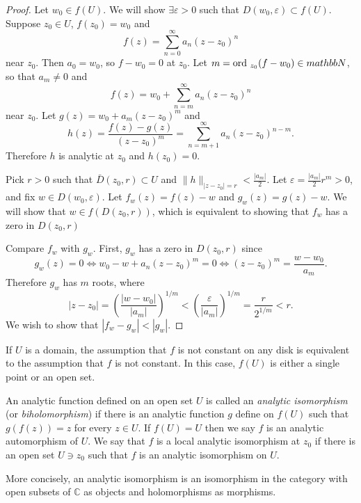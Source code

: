 \begin{proof}
Let $w_0 \in f(U)$. We will show $\exists \varepsilon > 0$
such that $D(w_0, \varepsilon) \subset f(U)$. Suppose
$z_0 \in U$, $f(z_0) = w_0$ and
$$
  f(z)
= \sum_{n=0}^\infty a_n (z - z_0)^n
$$ near $z_0$.
Then $a_0 = w_0$, so $f - w_0 = 0$ at $z_0$.
Let $m = \mathrm{ord}~_{z_0} (f - w_0) \in mathbb{N}$, so that
$a_m \neq 0$ and
$$
f(z) = w_0 + \sum_{n=m}^\infty a_n (z - z_0)^n
$$
near $z_0$. Let $g(z) = w_0 + a_m (z - z_0)^m$ and
$$
  h(z)
= \frac{f(z) - g(z)}{(z - z_0)^m}
= \sum_{n=m+1}^\infty a_n (z - z_0)^{n-m}.
$$
Therefore $h$ is analytic at $z_0$ and $h(z_0) = 0$.

Pick $r > 0$ such that
$\bar{D}(z_0, r) \subset U$ and
$\| h \|_{|z - z_0| = r} < \frac{|a_m|}{2}$. Let
$\varepsilon = \frac{|a_m|}{2} r^m > 0$, and fix
$w \in D(w_0, \varepsilon)$. Let $f_w(z) = f(z) - w$
and $g_w(z) = g(z) - w$. We will show that
$w \in f(D(z_0, r))$, which is equivalent to showing
that $f_w$ has a zero in $D(z_0, r)$

Compare $f_w$ with $g_w$. First, $g_w$ has a zero in
$D(z_0, r)$ since
$$
     g_w(z) = 0
\iff w_0 - w + a_n(z - z_0)^m = 0
\iff (z - z_0)^m = \frac{w - w_0}{a_m}.
$$
Therefore $g_w$ has $m$ roots, where
$$
  |z - z_0|
= \left(\frac{|w - w_0|}{|a_m|}\right)^{1 / m}
< \left(\frac{\varepsilon}{|a_m|}\right)^{1 / m}
= \frac{r}{2^{1 / m}}
< r.
$$
We wish to show that $|f_w - g_w| < |g_w|$.
\end{proof}


\begin{remark}
If $U$ is a domain, the assumption that $f$ is not constant
on any disk is equivalent to the assumption that $f$ is not
constant. In this case, $f(U)$ is either a single point or
an open set.
\end{remark}

\begin{defn}
An analytic function defined on an open set $U$ is called
an \emph{analytic isomorphism}
(or \emph{biholomorphism}) if there is an analytic
function $g$ define on $f(U)$ such that $g(f(z)) = z$
for every $z \in U$. If $f(U) = U$ then we say $f$ is
an analytic automorphism of $U$. We say that $f$ is a local
analytic isomorphism at $z_0$ if there is an open set $U \ni z_0$
such that $f$ is an analytic isomorphism on $U$.

More concisely, an analytic isomorphism is an isomorphism in the
category with open subsets of $\mathbb{C}$ as objects and
holomorphisms as morphisms.
\end{defn}

